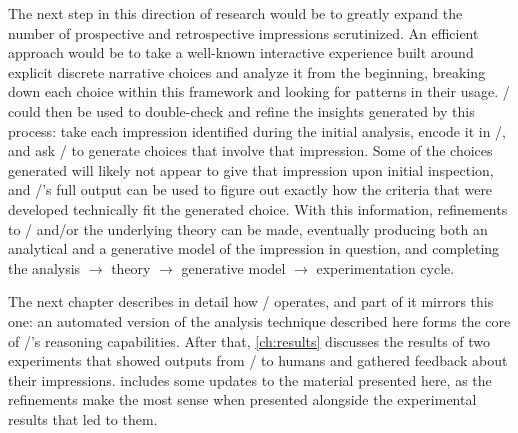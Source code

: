 The next step in this direction of research would be to greatly expand the number of prospective and retrospective impressions scrutinized.
%
An efficient approach would be to take a well-known interactive experience built around explicit discrete narrative choices and analyze it from the beginning, breaking down each choice within this framework and looking for patterns in their usage.
%
\dunyazad/ could then be used to double-check and refine the insights generated by this process: take each impression identified during the initial analysis, encode it in \dunyazad/, and ask \dunyazad/ to generate choices that involve that impression.
%
Some of the choices generated will likely not appear to give that impression upon initial inspection, and \dunyazad/'s full output can be used to figure out exactly how the criteria that were developed technically fit the generated choice.
%
With this information, refinements to \dunyazad/ and/or the underlying theory can be made, eventually producing both an analytical and a generative model of the impression in question, and completing the analysis $\rightarrow$ theory $\rightarrow$ generative model $\rightarrow$ experimentation cycle.


The next chapter describes in detail how \dunyazad/ operates, and part of it mirrors this one: an automated version of the analysis technique described here forms the core of \dunyazad/'s reasoning capabilities.
%
After that, \cref{ch:results} discusses the results of two experiments that showed outputs from \dunyazad/ to humans and gathered feedback about their impressions.
%
 includes some updates to the material presented here, as the refinements make the most sense when presented alongside the experimental results that led to them.

